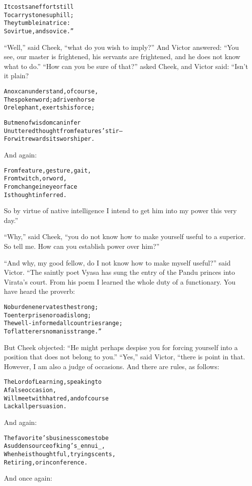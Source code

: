\documentclass{article}
\renewenvironment{verbatim}{\begin{alltt}\normalfont\begin{centering}}{\end{centering}\end{alltt}}
\begin{document}
\begin{verbatim}
It costs an effort still
To carry stones uphill;
They tumble in a trice:
So virtue, and so vice.”
\end{verbatim}
``Well,'' said Cheek, ``what do you wish to imply?'' And Victor
answered:
``You see, our master is frightened, his servants are frightened, and he does not know what to do.''
``How can you be sure of that?'' asked Cheek, and Victor said:
“Isn't it plain?

\begin{verbatim}
An ox can understand, of course,
The spoken word; a driven horse
Or elephant, exerts his force;

But men of wisdom can infer
Unuttered thought from features' stir--
For wit rewards its worshiper.
\end{verbatim}
And again:

\begin{verbatim}
From feature, gesture, gait,
    From twitch, or word,
From change in eye or face
    Is thought inferred.
\end{verbatim}
So by virtue of native intelligence I intend to get him into my
power this very day.”

``Why,'' said Cheek,
``you do not know how to make yourself useful to a superior. So tell me. How can you establish power over him?''

``And why, my good fellow, do I not know how to make myself useful?''
said Victor. “The saintly poet Vyasa has sung the entry of the
Pandu princes into Virata's court. From his poem I learned the
whole duty of a functionary. You have heard the proverb:

\begin{verbatim}
No burden enervates the strong;
To enterprise no road is long;
The well-informed all countries range;
To flatterers no man is strange.”
\end{verbatim}
But Cheek objected:
``He might perhaps despise you for forcing yourself into a position that does not belong to you.''
``Yes,'' said Victor, “there is point in that. However, I am also a
judge of occasions. And there are rules, as follows:

\begin{verbatim}
The Lord of Learning, speaking to
    A false occasion,
Will meet with hatred, and of course
    Lack all persuasion.
\end{verbatim}
And again:

\begin{verbatim}
The favorite's business comes to be
A sudden source of king's _ennui_,
When he is thoughtful, trying scents,
Retiring, or in conference.
\end{verbatim}
And once again:
\end{document}
